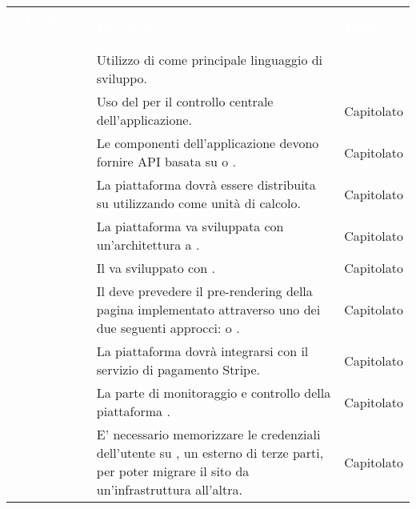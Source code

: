\renewcommand{\arraystretch}{1.5}


\begin{longtable}{|c C{9.5cm} C{2.5cm}|} 
	
	\textcolor{white}{\textbf{Codice Requisito}}&
	\textcolor{white}{\textbf{Descrizione}}&
	\textcolor{white}{\textbf{Fonte}}\\

	 & Utilizzo di  come principale linguaggio di sviluppo. &  \\
	
	 & Uso del   per il controllo centrale dell'applicazione. & Capitolato \\
	
	 & Le componenti dell'applicazione devono fornire API basata su  o . & Capitolato \\
	
	 & La piattaforma dovrà essere distribuita su  utilizzando  come unità di calcolo. & Capitolato \\
	
	 & La piattaforma va sviluppata con un'architettura a . & Capitolato \\
	
	 & Il  va sviluppato con . & Capitolato \\
	
	 & Il  deve prevedere il pre-rendering della pagina  implementato attraverso uno dei due seguenti approcci:  o . & Capitolato \\
	
	 & La piattaforma dovrà integrarsi con il servizio di pagamento Stripe. & Capitolato \\
	
	 & La parte di monitoraggio e controllo della piattaforma . & Capitolato \\
	
	 & E' necessario memorizzare le credenziali dell'utente su , un  esterno di terze parti, per poter migrare il sito da un'infrastruttura all'altra. & Capitolato \\
	

\end{longtable}
